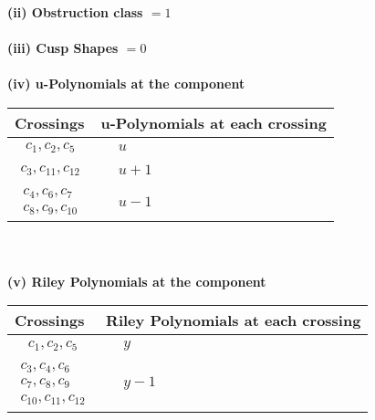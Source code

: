 \documentclass[1p]{elsarticle_modified}
\theoremstyle{definition}
\begin{document}
\flushleft \textbf{(ii) Obstruction class $= 1$}\\~\\
\flushleft \textbf{(iii) Cusp Shapes $= 0$}\\~\\
\newpage\renewcommand{\arraystretch}{1}
\flushleft \textbf{(iv) u-Polynomials at the component}\newline \\
\begin{tabular}{m{50pt}|m{274pt}}
Crossings & \hspace{64pt}u-Polynomials at each crossing \\
\hline $$\begin{aligned}c_{1},c_{2},c_{5}\end{aligned}$$&$\begin{aligned}
&u
\end{aligned}$\\
\hline $$\begin{aligned}c_{3},c_{11},c_{12}\end{aligned}$$&$\begin{aligned}
&u+1
\end{aligned}$\\
\hline $$\begin{aligned}c_{4},c_{6},c_{7}\\c_{8},c_{9},c_{10}\end{aligned}$$&$\begin{aligned}
&u-1
\end{aligned}$\\
\hline
\end{tabular}\\~\\
\newpage\renewcommand{\arraystretch}{1}
\flushleft \textbf{(v) Riley Polynomials at the component}\newline \\
\begin{tabular}{m{50pt}|m{274pt}}
Crossings & \hspace{64pt}Riley Polynomials at each crossing \\
\hline $$\begin{aligned}c_{1},c_{2},c_{5}\end{aligned}$$&$\begin{aligned}
&y
\end{aligned}$\\
\hline $$\begin{aligned}c_{3},c_{4},c_{6}\\c_{7},c_{8},c_{9}\\c_{10},c_{11},c_{12}\end{aligned}$$&$\begin{aligned}
&y-1
\end{aligned}$\\
\hline
\end{tabular}\\~\\
\end{document}
